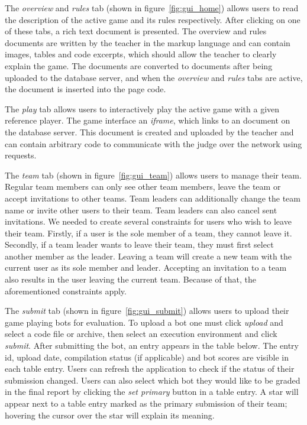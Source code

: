 The \emph{overview} and \emph{rules} tab (shown in figure~\ref{fig:gui_home}) allows users to read the description of the active game and its rules respectively. After clicking on one of these tabs, a rich text document is presented. The overview and rules documents are written by the teacher in the  markup language and can contain images, tables and code excerpts, which should allow the teacher to clearly explain the game. The  documents are converted to  documents after being uploaded to the database server, and when the \emph{overview} and \emph{rules} tabs are active, the  document is inserted into the page code.

The \emph{play} tab allows users to interactively play the active game with a given reference player. The game interface an \emph{iframe}, which links to an  document on the database server. This document is created and uploaded by the teacher and can contain arbitrary  code to communicate with the judge over the network using  requests.

The \emph{team} tab (shown in figure~\ref{fig:gui_team}) allows users to manage their team. Regular team members can only see other team members, leave the team or accept invitations to other teams. Team leaders can additionally change the team name or invite other users to their team. Team leaders can also cancel sent invitations. We needed to create several constraints for users who wish to leave their team. Firstly, if a user is the sole member of a team, they cannot leave it. Secondly, if a team leader wants to leave their team, they must first select another member as the leader. Leaving a team will create a new team with the current user as its sole member and leader. Accepting an invitation to a team also results in the user leaving the current team. Because of that, the aforementioned constraints apply.

The \emph{submit} tab (shown in figure~\ref{fig:gui_submit}) allows users to upload their game playing bots for evaluation. To upload a bot one must click \emph{upload} and select a code file or archive, then select an execution environment and click \emph{submit}. After submitting the bot, an entry appears in the table below. The entry id, upload date, compilation status (if applicable) and bot scores are visible in each table entry. Users can refresh the application to check if the status of their submission changed. Users can also select which bot they would like to be graded in the final report by clicking the \emph{set primary} button in a table entry. A star will appear next to a table entry marked as the primary submission of their team; hovering the cursor over the star will explain its meaning.


